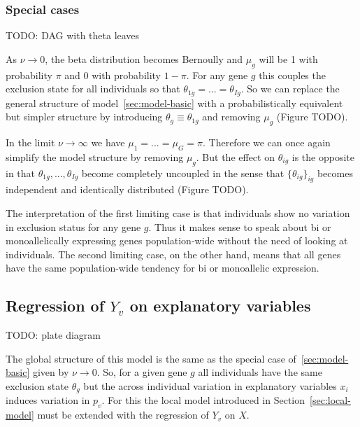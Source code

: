 \documentclass[letterpaper]{article}
\begin{document}
\subsubsection{Special cases}

TODO: DAG with theta leaves

As \(\nu\rightarrow 0\), the beta distribution becomes Bernoully and \(\mu_g\) will be 1 with probability \(\pi\) and 0 with
probability \(1-\pi\).  For any gene \(g\) this couples the exclusion state
for all individuals so that \(\theta_{1g}=...=\theta_{Ig}\).  So we can
replace the general structure of model~\ref{sec:model-basic} with a
probabilistically equivalent but simpler structure by introducing
\(\theta_g\equiv\theta_{1g}\) and removing \(\mu_g\) (Figure TODO).

In the limit \(\nu\rightarrow\infty\) we have \(\mu_1=...=\mu_G=\pi\).
Therefore we can once again simplify the model structure by removing
\(\mu_g\).  But the effect on \(\theta_{ig}\) is the opposite
in that \(\theta_{1g},...,\theta_{Ig}\) become completely uncoupled in the
sense that \(\{\theta_{ig}\}_{ig}\) becomes independent and identically
distributed (Figure TODO).

The interpretation of the first limiting case is that individuals show no
variation in exclusion status for any gene \(g\).  Thus it makes sense to
speak about bi or monoallelically expressing genes population-wide without the
need of looking at individuals.  The second limiting case, on the other hand,
means that all genes have the same population-wide tendency for bi or
monoallelic expression.

\subsection{Regression of \(Y_v\) on explanatory variables }
\label{sec:model-Y-regr}

TODO: plate diagram

The global structure of this model is the same as the special case
of~\ref{sec:model-basic} given by
\(\nu\rightarrow 0\).  So, for a given gene \(g\) all individuals have the same
exclusion state \(\theta_g\) but the across individual variation in
explanatory variables \(x_i\) induces variation in \(p_v\).  For this the
local model introduced in Section~\ref{sec:local-model} must be extended with
the regression of \(Y_v\) on \(X\).
\end{document}
